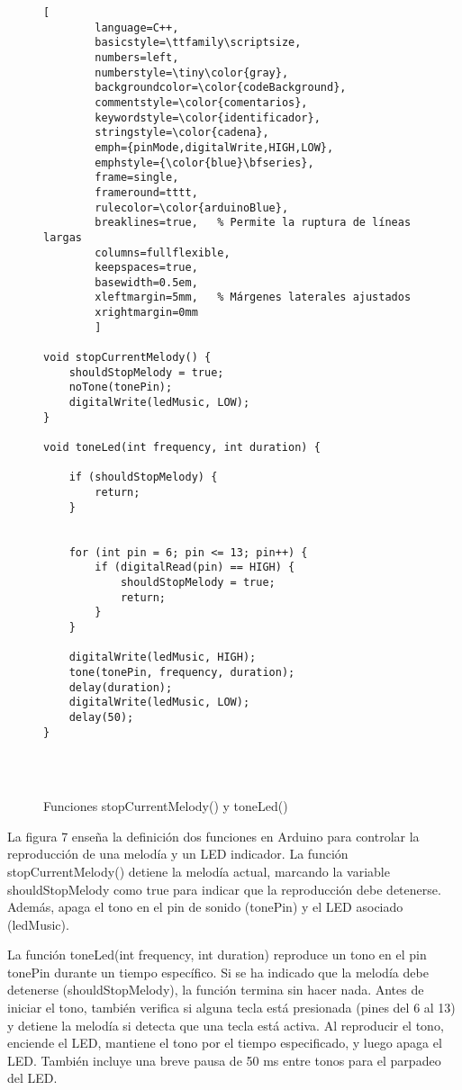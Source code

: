 
\setlength{\parindent}{0pt}
\setlength{\parskip}{6pt}
\begin{figure}[H]
	\centering
	\begin{lstlisting}[
		language=C++,
		basicstyle=\ttfamily\scriptsize,
		numbers=left,
		numberstyle=\tiny\color{gray},
		backgroundcolor=\color{codeBackground},
		commentstyle=\color{comentarios},
		keywordstyle=\color{identificador},
		stringstyle=\color{cadena},
		emph={pinMode,digitalWrite,HIGH,LOW},
		emphstyle={\color{blue}\bfseries},
		frame=single,
		frameround=tttt,
		rulecolor=\color{arduinoBlue},
		breaklines=true,   % Permite la ruptura de líneas largas
		columns=fullflexible,
		keepspaces=true,
		basewidth=0.5em,
		xleftmargin=5mm,   % Márgenes laterales ajustados
		xrightmargin=0mm
		]
		
void stopCurrentMelody() {
	shouldStopMelody = true;
	noTone(tonePin);
	digitalWrite(ledMusic, LOW);
}

void toneLed(int frequency, int duration) {

	if (shouldStopMelody) {
		return;
	}
	

	for (int pin = 6; pin <= 13; pin++) {
		if (digitalRead(pin) == HIGH) {
			shouldStopMelody = true;
			return;
		}
	}
	
	digitalWrite(ledMusic, HIGH);
	tone(tonePin, frequency, duration);
	delay(duration);
	digitalWrite(ledMusic, LOW);
	delay(50);  
}


	
\end{lstlisting}
\caption{Funciones stopCurrentMelody() y toneLed()}
\label{fig:codigo-led}
\end{figure}
La figura 7 enseña la definición dos funciones en Arduino para controlar la reproducción de una melodía y un LED indicador. La función stopCurrentMelody() detiene la melodía actual, marcando la variable shouldStopMelody como true para indicar que la reproducción debe detenerse. Además, apaga el tono en el pin de sonido (tonePin) y el LED asociado (ledMusic).

La función toneLed(int frequency, int duration) reproduce un tono en el pin tonePin durante un tiempo específico. Si se ha indicado que la melodía debe detenerse (shouldStopMelody), la función termina sin hacer nada. Antes de iniciar el tono, también verifica si alguna tecla está presionada (pines del 6 al 13) y detiene la melodía si detecta que una tecla está activa. Al reproducir el tono, enciende el LED, mantiene el tono por el tiempo especificado, y luego apaga el LED. También incluye una breve pausa de 50 ms entre tonos para el parpadeo del LED.